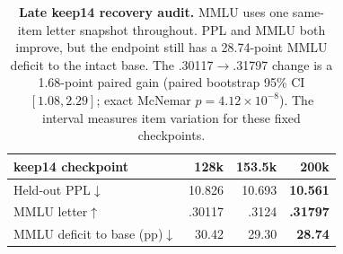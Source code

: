 \begin{table}[t]
\centering
\scriptsize
\setlength{\tabcolsep}{3.0pt}
\begin{tabular}{@{}lrrr@{}}
\toprule
\textbf{keep14 checkpoint} & \textbf{128k} & \textbf{153.5k} & \textbf{200k} \\
\midrule
Held-out PPL$\downarrow$ & 10.826 & 10.693 & \textbf{10.561} \\
MMLU letter$\uparrow$ & .30117 & .3124 & \textbf{.31797} \\
MMLU deficit to base (pp)$\downarrow$ & 30.42 & 29.30 & \textbf{28.74} \\
\bottomrule
\end{tabular}
\caption{\textbf{Late keep14 recovery audit.} MMLU uses one same-item letter
snapshot throughout. PPL and MMLU both improve, but the endpoint still has a
28.74-point MMLU deficit to the intact base. The .30117$\rightarrow$.31797
change is a 1.68-point paired gain
(paired bootstrap 95\% CI $[1.08,2.29]$; exact McNemar
$p=4.12{\times}10^{-8}$). The interval measures item variation for these fixed
checkpoints.}
\label{tab:trajectory-audit}
\end{table}
